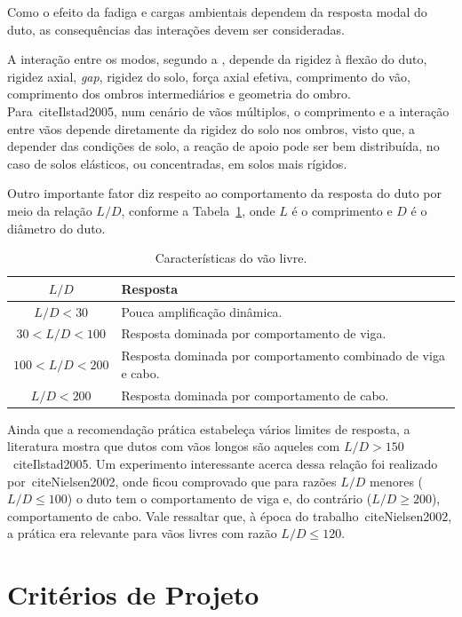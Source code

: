 Como o efeito da fadiga e cargas ambientais dependem da resposta modal do duto, as consequências das interações devem ser consideradas.

A interação entre os modos, segundo a , depende da rigidez à flexão do duto, rigidez axial, \textit{gap}, rigidez do solo, força axial efetiva, comprimento do vão, comprimento dos ombros intermediários e geometria do ombro.
Para~cite{Ilstad2005}, num cenário de vãos múltiplos, o comprimento e a interação entre vãos depende diretamente da rigidez do solo nos ombros, visto que, a depender das condições de solo, a reação de apoio pode ser bem distribuída, no caso de solos elásticos, ou concentradas, em solos mais rígidos.

Outro importante fator diz respeito ao comportamento da resposta do duto por meio da relação $L/D$, conforme a Tabela~\ref{tab:viv-caracvao}, onde $L$ é o comprimento e $D$ é o diâmetro do duto.

\begin{table}[ht!]
	\renewcommand{\arraystretch}{1.2}
 	\small
 	\centering
 	\caption{Características do vão livre.}
 	\label{tab:viv-caracvao}
 	\begin{tabular}{cl}
	 	\toprule
	 	$L/D$             & Resposta\\
	 	\midrule
	 	$L/D < 30$        & Pouca amplificação dinâmica. \\
	 	$30 < L/D < 100$  & Resposta dominada por comportamento de viga. \\
	 	$100 < L/D < 200$ & Resposta dominada por comportamento combinado de viga e cabo. \\
	 	$L/D < 200$       & Resposta dominada por comportamento de cabo. \\
	 	\bottomrule
 	\end{tabular}
\end{table}

Ainda que a recomendação prática estabeleça vários limites de resposta, a literatura mostra que dutos com vãos longos são aqueles com $L/D > 150$~cite{Ilstad2005}.
Um experimento interessante acerca dessa relação foi realizado por~cite{Nielsen2002}, onde ficou comprovado que para razões $L/D$ menores ($L/D \leq 100$) o duto tem o comportamento de viga e, do contrário ($L/D \geq 200$), comportamento de cabo.
Vale ressaltar que, à época do trabalho~cite{Nielsen2002}, a prática era relevante para vãos livres com razão $L/D \leq 120$.

\section{Critérios de Projeto}

